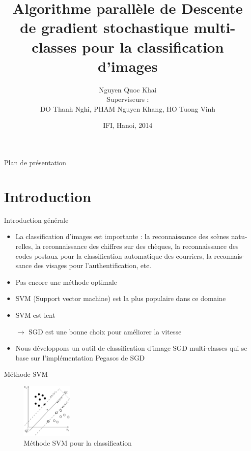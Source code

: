 \documentclass[11pt]{beamer}
\title{Algorithme parallèle de
Descente de gradient stochastique
multi-classes pour la classification d'images
}
\author[1]{Nguyen Quoc Khai \\[\baselineskip]
Superviseurs :\\
DO Thanh Nghi, PHAM Nguyen Khang, HO Tuong Vinh
}
\date{IFI, Hanoi, 2014}
\begin{document}
\begin{otherlanguage}{french}
\begin{frame}
  \titlepage
\end{frame}

\begin{frame}{Plan de présentation}
  \tableofcontents
\end{frame}

\section{Introduction}
\begin{frame}{Introduction générale}
\begin{itemize}
\item La classification d'images est importante : la reconnaissance des scènes naturelles, la reconnaissance des chiffres sur des chèques, la reconnaissance des codes postaux pour la classification automatique des courriers, la reconnaissance des visages pour l'authentification, etc.

\item Pas encore une méthode optimale

\item SVM (Support vector machine) est la plus populaire dans ce domaine

\item SVM est lent

$\rightarrow$ SGD est une bonne choix pour améliorer la vitesse

\item Nous développons un outil de classification d'image SGD multi-classes qui se base sur l'implémentation Pegasos de SGD

\end{itemize}
\end{frame}

\begin{frame}{Méthode SVM}

\begin{figure}[ht!]
\centering
\includegraphics[width=25mm]{images/svm}
\caption{Méthode SVM pour la classification}
\label{overflow}
\end{figure}


\end{frame}
\end{otherlanguage}
\end{document}
